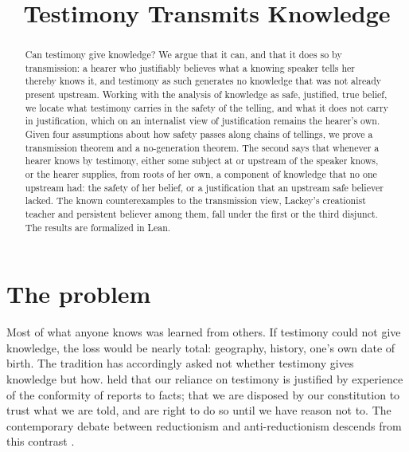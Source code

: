 \documentclass{situationist-preprint}
\title{Testimony Transmits Knowledge}
\begin{document}
\maketitle

\begin{abstract}
Can testimony give knowledge? We argue that it can, and that it does so by transmission: a hearer who justifiably believes what a knowing speaker tells her thereby knows it, and testimony as such generates no knowledge that was not already present upstream. Working with the analysis of knowledge as safe, justified, true belief, we locate what testimony carries in the safety of the telling, and what it does not carry in justification, which on an internalist view of justification remains the hearer's own. Given four assumptions about how safety passes along chains of tellings, we prove a transmission theorem and a no-generation theorem. The second says that whenever a hearer knows by testimony, either some subject at or upstream of the speaker knows, or the hearer supplies, from roots of her own, a component of knowledge that no one upstream had: the safety of her belief, or a justification that an upstream safe believer lacked. The known counterexamples to the transmission view, Lackey's creationist teacher and persistent believer among them, fall under the first or the third disjunct. The results are formalized in Lean.
\end{abstract}

\section{The problem}

Most of what anyone knows was learned from others. If testimony could not give knowledge, the loss would be nearly total: geography, history, one's own date of birth. The tradition has accordingly asked not whether testimony gives knowledge but how. \citet[X]{HumeEnquiry} held that our reliance on testimony is justified by experience of the conformity of reports to facts; \citet[VI.24]{Reid1764} that we are disposed by our constitution to trust what we are told, and are right to do so until we have reason not to. The contemporary debate between reductionism and anti-reductionism descends from this contrast \citep{Coady1992,Fricker1995}.
\end{document}
